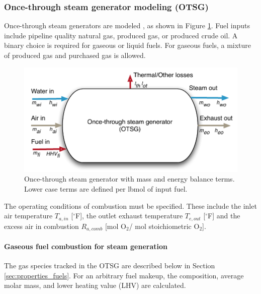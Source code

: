 \documentclass[11pt]{report}
\newcommand{\marg}[1]{{\footnotesize\textit{\textcolor{stanford}{'#1'}}}}
\newcommand{\marginnote}[1]{\marginpar{\marg{#1}}}
\begin{document}

\subsubsection{Once-through steam generator modeling (OTSG)}
Once-through steam generators are modeled \cite{Ganapathy2003, Brandt2010}, as shown in Figure \ref{fig:OTSG}. \marginnote{Steam Generation 2.2}
Fuel inputs include pipeline quality natural gas, produced gas, or produced crude oil. A binary choice is required for gaseous or liquid fuels. For gaseous fuels, a mixture of produced gas and purchased gas is allowed.

\begin{figure}[t]
\includegraphics[width=0.65\columnwidth]{images/OTSG.pdf}
\caption{Once-through steam generator with mass and energy balance terms. Lower case terms are defined per lbmol of input fuel.}
\label{fig:OTSG}
\end{figure}

The operating conditions of combustion must be specified. These include the inlet air temperature $T_{a,in}$ [$^\circ$F], the outlet exhaust temperature $T_{e,out}$ [$^\circ$F] and the excess air in combustion $R_{a,comb}$ [mol O$_2$/ mol stoichiometric O$_2$].


\paragraph{Gaseous fuel combustion for steam generation}

The gas species tracked in the OTSG are described below in Section \ref{sec:properties_fuels}. \marginnote{Steam Generation 2.2.3} For an arbitrary fuel makeup, the composition, average molar mass, and lower heating value (LHV) are calculated.
\end{document}

